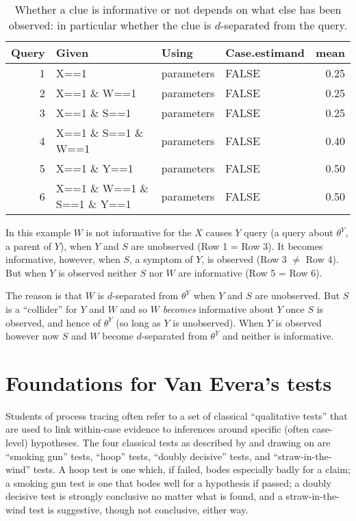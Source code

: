\documentclass[
  12pt,
]{book}
\begin{document}
\begin{table}

\caption{\label{tab:unnamed-chunk-88}Whether a clue is informative or not depends on what else has been observed: in particular whether the clue is $d$-separated from the query.}
\centering
\begin{tabular}[t]{r|l|l|l|r}
\hline
Query & Given & Using & Case.estimand & mean\\
\hline
1 & X==1 & parameters & FALSE & 0.25\\
\hline
2 & X==1 \& W==1 & parameters & FALSE & 0.25\\
\hline
3 & X==1 \& S==1 & parameters & FALSE & 0.25\\
\hline
4 & X==1 \& S==1 \& W==1 & parameters & FALSE & 0.40\\
\hline
5 & X==1 \& Y==1 & parameters & FALSE & 0.50\\
\hline
6 & X==1 \& W==1 \& S==1 \& Y==1 & parameters & FALSE & 0.50\\
\hline
\end{tabular}
\end{table}

In this example \(W\) is not informative for the \(X\) causes \(Y\) query (a query about \(\theta^Y\), a parent of \(Y\)), when \(Y\) and \(S\) are unobserved (Row 1 = Row 3). It becomes informative, however, when \(S\), a symptom of \(Y\), is observed (Row 3 \(\neq\) Row 4). But when \(Y\) is observed neither \(S\) nor \(W\) are informative (Row 5 = Row 6).

The reason is that \(W\) is \(d\)-separated from \(\theta^Y\) when \(Y\) and \(S\) are unobserved. But \(S\) is a ``collider'' for \(Y\) and \(W\) and so \(W\) \emph{becomes} informative about \(Y\) once \(S\) is observed, and hence of \(\theta^Y\) (so long as \(Y\) is unobserved). When \(Y\) is observed however now \(S\) and \(W\) become \(d\)-separated from \(\theta^Y\) and neither is informative.

\hypertarget{foundations-for-van-everas-tests}{%
\section{Foundations for Van Evera's tests}\label{foundations-for-van-everas-tests}}

Students of process tracing often refer to a set of classical ``qualitative tests'' that are used to link within-case evidence to inferences around specific (often case-level) hypotheses. The four classical tests as described by \citet{collier2011understanding} and drawing on \citet{Van-Evera:1997} are ``smoking gun'' tests, ``hoop'' tests, ``doubly decisive'' tests, and ``straw-in-the-wind'' tests. A hoop test is one which, if failed, bodes especially badly for a claim; a smoking gun test is one that bodes well for a hypothesis if passed; a doubly decisive test is strongly conclusive no matter what is found, and a straw-in-the-wind test is suggestive, though not conclusive, either way.
\end{document}
